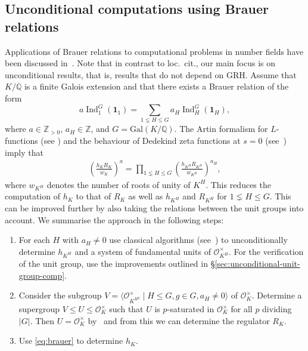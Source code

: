 \documentclass[12pt, a4paper, usenames]{amsart}
\newcommand{\Z}{\mathbb{Z}}
\newcommand{\Q}{\mathbb{Q}}
\theoremstyle{plain}
\theoremstyle{remark}
\theoremstyle{definition}
\newcommand{\Gal}{\mathrm{Gal}}
\begin{document}
\subsection{Unconditional computations using Brauer relations}\label{subsec:unconditional-invs}
Applications of Brauer relations to computational problems in number fields have been discussed
in~\cite{MR4440537}.
Note that in contrast to loc.\ cit., our main focus is on unconditional results, that is, results that do not depend on GRH.
Assume that $K/\Q$ is a finite Galois extension and that there exists a
Brauer relation of the form
\[ 
a \operatorname{Ind}_{1}^G(\mathbf{1}_1) = \sum_{1 \lneq H \leq G} a_H \operatorname{Ind}_H^G(\mathbf{1}_H), 
\]
where $a \in \Z_{>0}$, $a_H \in \Z$, and $G=\Gal(K/\Q)$. 
The Artin formalism for $L$-functions (see \cite[(10.4)~Proposition]{MR1697859}) and 
the behaviour of Dedekind zeta functions at $s=0$ 
(see~\cite[Chapitre~2, 2.2~Corollaire]{MR782485}) imply that
\begin{align}\label{eq:brauer}
\left(\frac{h_K R_K}{w_K}\right)^{a} 
= 
\prod_{1 \lneq H \leq G} \left(\frac{h_{K^H} R_{K^H}}{w_{K^H}}\right)^{a_H}, 
\end{align}
where $w_{K^H}$ denotes the number of roots of unity of $K^{H}$.
This reduces the computation of $h_{K}$ to that of $R_{K}$ as well as $h_{K^H}$ and $R_{K^H}$ for $1 \lneq H \leq G$.
This can be improved further by also taking the 
relations between the unit groups into account.
We summarise the approach in the following steps:
\begin{enumerate}
    \item 
    For each $H$ with $a_H \neq 0$ use classical algorithms (see~\cite[Section~6.5]{MR1228206}) to unconditionally determine $h_{K^H}$ and a system of fundamental units of $\mathcal{O}_{K^H}^\times$.
    For the verification of the unit group, use the improvements outlined
    in \S \ref{sec:unconditional-unit-group-comp}.
    \item 
    Consider the subgroup 
    $V = \langle \mathcal{O}_{K^{H^g}}^\times \mid H \leq G, g \in G, a_H \neq 0 \rangle$ of $\mathcal{O}_{K}^{\times}$.
    Determine a supergroup $V \leq U \leq \mathcal{O}_{K}^{\times}$ 
    such that $U$ is $p$-saturated in $\mathcal{O}_{K}^{\times}$ 
    for all $p$ dividing $\lvert G \rvert$. 
    Then $U = \mathcal{O}_{K}^{\times}$ by~\cite[Corollary~3.4]{MR4440537} and from this we can determine the regulator $R_{K}$.
    \item
    Use \eqref{eq:brauer} to determine $h_{K}$.
\end{enumerate}
\end{document}
